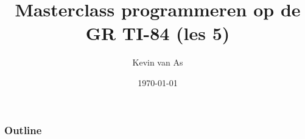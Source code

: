 \documentclass{beamer}
\title{Masterclass programmeren op de GR TI-84 (les 5)}
\author{Kevin van As}
\date{\today}
\begin{document}
\begin{frame}
\titlepage
\end{frame}



\begin{frame}
\frametitle{Outline}
\tableofcontents
\end{frame}






% 
%
%
% 
%
%
% 
%
\end{document}
